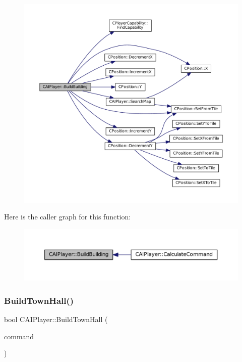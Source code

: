 \begin{figure}[H]
\begin{center}
\leavevmode
\includegraphics[width=350pt]{classCAIPlayer_a2ff5263cbaa6bfc62ffec4dbce87ba88_cgraph}
\end{center}
\end{figure}
Here is the caller graph for this function\+:\nopagebreak
\begin{figure}[H]
\begin{center}
\leavevmode
\includegraphics[width=350pt]{classCAIPlayer_a2ff5263cbaa6bfc62ffec4dbce87ba88_icgraph}
\end{center}
\end{figure}
\hypertarget{classCAIPlayer_a41cdefbe14210fb70b793a32778c5141}{}\label{classCAIPlayer_a41cdefbe14210fb70b793a32778c5141} 
\subsubsection{\texorpdfstring{Build\+Town\+Hall()}{BuildTownHall()}}
{\footnotesize\ttfamily bool C\+A\+I\+Player\+::\+Build\+Town\+Hall (\begin{DoxyParamCaption}\item[{\hyperlink{structSPlayerCommandRequest}{S\+Player\+Command\+Request} \&}]{command }\end{DoxyParamCaption})\hspace{0.3cm}{\ttfamily [protected]}}



